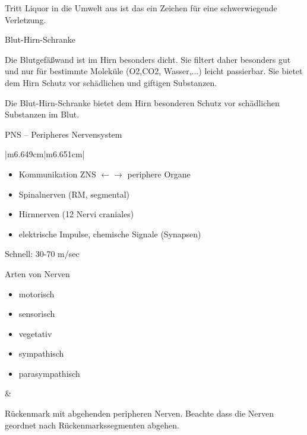 \documentclass{article}
\begin{document}
Tritt Liquor in die Umwelt aus ist das ein Zeichen f\"ur eine
schwerwiegende Verletzung. 

Blut-Hirn-Schranke 

Die Blutgef\"a{\ss}wand ist im Hirn besonders dicht. Sie filtert daher
besonders gut und nur f\"ur bestimmte Molek\"ule (O2,CO2, Wasser,...)
leicht passierbar. Sie bietet dem Hirn Schutz vor sch\"adlichen und
giftigen Substanzen. 

Die Blut-Hirn-Schranke bietet dem Hirn besonderen Schutz vor
sch\"adlichen Substanzen im Blut. 

PNS -- Peripheres Nervensystem

\begin{center}
\tablehead{}\begin{supertabular}{|m{6.649cm}|m{6.651cm}|}
\hline
\begin{itemize}
\item Kommunikation ZNS ${\leftarrow}$${\rightarrow}$ periphere  Organe

\item Spinalnerven (RM, segmental)

\item Hirnnerven (12 Nervi craniales)

\item elektrische Impulse, chemische Signale (Synapsen)

\end{itemize}
Schnell: 30-70 m/sec

Arten von Nerven

\begin{itemize}
\item motorisch

\item sensorisch

\item vegetativ

\end{itemize}
\begin{itemize}
\item sympathisch

\item parasympathisch

\end{itemize}
 &
 \par

R\"uckenmark mit abgehenden peripheren Nerven. Beachte dass die Nerven
geordnet nach R\"uckenmarkssegmenten abgehen. 

\\\hline
\end{supertabular}
\end{center}
\end{document}
